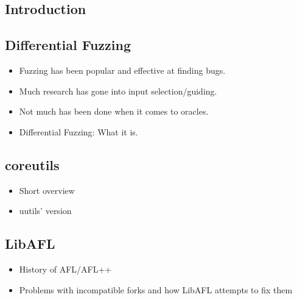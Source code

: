 \documentclass{article}
\begin{document}
\begin{multicols}{2}
    \section{Introduction}
    \subsection{Differential Fuzzing}
    \begin{itemize}
        \item Fuzzing has been popular and effective at finding bugs.
        \item Much research has gone into input selection/guiding.
        \item Not much has been done when it comes to oracles.
        \item Differential Fuzzing: What it is.
    \end{itemize}

    \subsection{coreutils}
    \begin{itemize}
        \item Short overview
        \item uutils' version
    \end{itemize}

    \subsection{LibAFL}
    \begin{itemize}
        \item History of AFL/AFL++
        \item Problems with incompatible forks and how LibAFL attempts to fix them
    \end{itemize}


\end{multicols}
\end{document}
